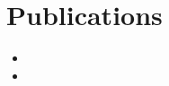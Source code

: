 \documentclass{article}
\begin{document}
  \nocite{*}
  
  \togglefalse{myrefs}
  
  

  \section*{Publications}

  \toggletrue{myrefs}
  \nobibliography*
  \begin{itemize}
    \item {}
    \item {}
  \end{itemize}
\end{document}

